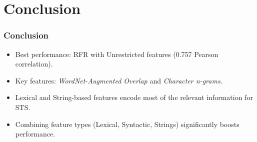 \section{Conclusion}
\frame{\tableofcontents[currentsection]}

\begin{frame}
    \frametitle{Conclusion}
    \begin{itemize}
        \item Best performance: RFR with Unrestricted features (0.757 Pearson correlation).
        \item Key features: \textit{WordNet-Augmented Overlap} and \textit{Character n-grams}.
        \item Lexical and String-based features encode most of the relevant information for STS.
        \item Combining feature types (Lexical, Syntactic, Strings) significantly boosts performance.
    \end{itemize}
\end{frame}